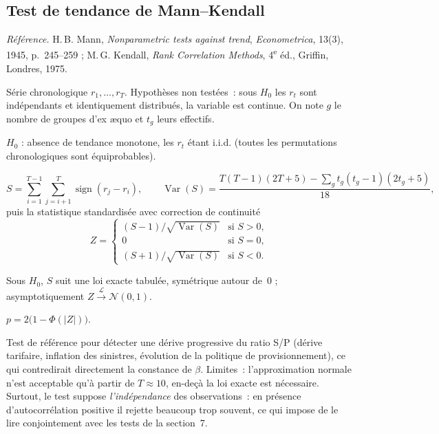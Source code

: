 \documentclass[a4paper,11pt]{article}
\newcommand{\refl}[1]{{\small\textcolor{maincolor!70!black}{\textit{Référence.} #1}}\par\smallskip}
\newcounter{ficheid}
\newenvironment{fiche}[1]{%
  \stepcounter{ficheid}%
  \phantomsection
  \subsection{#1}%
  \label{fiche:\theficheid}%
}{%
  \end{description}\vspace{0.5em}%
}
\newcommand{\Cadre}{%
  \begin{description}[leftmargin=0pt, style=unboxed, itemsep=3pt, topsep=3pt, parsep=2pt]%
  \item[\textcolor{financeblue}{\textbf{1. Cadre, notations et hypothèses de validité (non testées).}}]}
\newcommand{\Hzero}{\item[\textcolor{financeblue}{\textbf{2. Hypothèse nulle.}}]}
\newcommand{\Stat}{\item[\textcolor{financeblue}{\textbf{3. Statistique de test.}}]}
\newcommand{\Loi}{\item[\textcolor{financeblue}{\textbf{4. Loi sous $H_0$.}}]}
\newcommand{\Pval}{\item[\textcolor{financeblue}{\textbf{5. p-value.}}]}
\newcommand{\Usage}{\item[\textcolor{financeblue}{\textbf{6. Usage et limites.}}]}
\begin{document}
\begin{fiche}{Test de tendance de Mann--Kendall}
\refl{H.\,B. Mann, \emph{Nonparametric tests against trend}, \emph{Econometrica}, 13(3), 1945,
p.~245--259 ; M.\,G. Kendall, \emph{Rank Correlation Methods}, 4\textsuperscript{e} éd., Griffin,
Londres, 1975.}
\Cadre
Série chronologique $r_1,\dots,r_T$. Hypothèses non testées~: sous $H_0$ les $r_t$ sont
indépendants et identiquement distribués, la variable est continue. On note $g$ le nombre de
groupes d'ex \ae quo et $t_g$ leurs effectifs.
\Hzero
$H_0$ : absence de tendance monotone, les $r_t$ étant i.i.d. (toutes les permutations
chronologiques sont équiprobables).
\Stat
\[
  S = \sum_{i=1}^{T-1}\sum_{j=i+1}^{T} \operatorname{sign}(r_j - r_i),
  \qquad
  \operatorname{Var}(S) = \frac{T(T-1)(2T+5) - \sum_g t_g(t_g-1)(2t_g+5)}{18},
\]
puis la statistique standardisée avec correction de continuité
\[
  Z = \begin{cases}
    (S-1)/\sqrt{\operatorname{Var}(S)} & \text{si } S > 0,\\[2pt]
    0 & \text{si } S = 0,\\[2pt]
    (S+1)/\sqrt{\operatorname{Var}(S)} & \text{si } S < 0.
  \end{cases}
\]
\Loi
Sous $H_0$, $S$ suit une loi exacte tabulée, symétrique autour de~0 ; asymptotiquement
$Z \xrightarrow{\ \mathcal{L}\ } \mathcal{N}(0,1)$.
\Pval
$p = 2\big(1 - \Phi(|Z|)\big)$.
\Usage
Test de référence pour détecter une dérive progressive du ratio S/P (dérive tarifaire, inflation
des sinistres, évolution de la politique de provisionnement), ce qui contredirait directement la
constance de $\beta$. Limites~: l'approximation normale n'est acceptable qu'à partir de
$T \approx 10$, en-deçà la loi exacte est nécessaire. Surtout, le test suppose
\emph{l'indépendance} des observations~: en présence d'autocorrélation positive il rejette
beaucoup trop souvent, ce qui impose de le lire conjointement avec les tests de la section~7.
\end{fiche}
\end{document}
